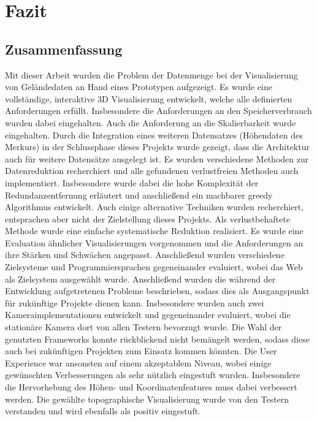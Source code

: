 \chapter{Fazit}\label{chapter7}

\section{Zusammenfassung}
Mit dieser Arbeit wurden die Problem der Datenmenge bei der Visualisierung von Geländedaten an Hand eines Prototypen aufgezeigt. Es wurde eine vollständige, interaktive 3D Visualisierung entwickelt, welche alle definierten Anforderungen erfüllt. Insbesondere die Anforderungen an den Speicherverbrauch wurden dabei eingehalten. Auch die Anforderung an die Skalierbarkeit wurde eingehalten. Durch die Integration eines weiteren Datensatzes (Höhendaten des Merkurs) in der Schlussphase dieses Projekts wurde gezeigt, dass die Architektur auch für weitere Datensätze ausgelegt ist. Es wurden verschiedene Methoden zur Datenreduktion recherchiert und alle gefundenen verlustfreien Methoden auch implementiert. Insbesondere wurde dabei die hohe Komplexität der Redundanzentfernung erläutert und anschließend ein machbarer greedy Algorithmus entwickelt. Auch einige alternative Techniken wurden recherchiert, entsprachen aber nicht der Zielstellung dieses Projekts. Als verlustbehaftete Methode wurde eine einfache systematische Reduktion realisiert. Es wurde eine Evaluation ähnlicher Visualisierungen vorgenommen und die Anforderungen an ihre Stärken und Schwächen angepasst. Anschließend wurden verschiedene Zielsysteme und Programmiersprachen gegeneinander evaluiert, wobei das Web als Zielsystem ausgewählt wurde. Anschließend wurden die während der Entwicklung aufgetretenen Probleme beschrieben, sodass dies als Ausgangspunkt für zukünftige Projekte dienen kann. Insbesondere wurden auch zwei Kameraimplementationen entwickelt und gegeneinander evaluiert, wobei die stationäre Kamera dort von allen Testern bevorzugt wurde. Die Wahl der genutzten Frameworks konnte rückblickend nicht bemängelt werden, sodass diese auch bei zukünftigen Projekten zum Einsatz kommen könnten. Die User Experience war ansonsten auf einem akzeptablem Niveau, wobei einige gewünschten Verbesserungen als sehr nützlich eingestuft wurden. Insbesondere die Hervorhebung des Höhen- und Koordinatenfeatures muss dabei verbessert werden. Die gewählte topographische Visualisierung wurde von den Testern verstanden und wird ebenfalls als positiv eingestuft.

